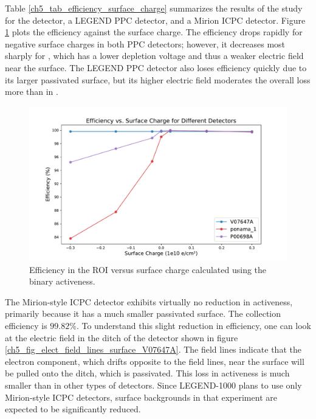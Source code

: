 Table \ref{ch5_tab_efficiency_surface_charge} summarizes the results of the study for the {\ponama} detector, a LEGEND PPC detector, and a Mirion ICPC detector. Figure \ref{fig:efficiency_sc_plot} plots the efficiency against the surface charge. The efficiency drops rapidly for negative surface charges in both PPC detectors; however, it decreases most sharply for {\ponama}, which has a lower depletion voltage and thus a weaker electric field near the surface. The LEGEND PPC detector also loses efficiency quickly due to its larger passivated surface, but its higher electric field moderates the overall loss more than in {\ponama}.

\begin{figure}%
\centering
\includegraphics[trim={1.6cm 0.3cm 2cm 1.8cm},clip,width=\linewidth]{ch5/figs/efficiency_0nbb.pdf}
\caption{Efficiency in the ROI versus surface charge calculated using the binary activeness.}
\label{fig:efficiency_sc_plot}
\end{figure}

The Mirion-style ICPC detector exhibits virtually no reduction in activeness, primarily because it has a much smaller passivated surface. The collection efficiency is $99.82\%$. To understand this slight reduction in efficiency, one can look at the electric field in the ditch of the detector shown in figure \ref{ch5_fig_elect_field_lines_surface_V07647A}. The field lines indicate that the electron component, which drifts opposite to the field lines, near the surface will be pulled onto the ditch, which is passivated. This loss in activeness is much smaller than in other types of detectors. Since LEGEND-1000 plans to use only Mirion-style ICPC detectors, surface backgrounds in that experiment are expected to be significantly reduced.


